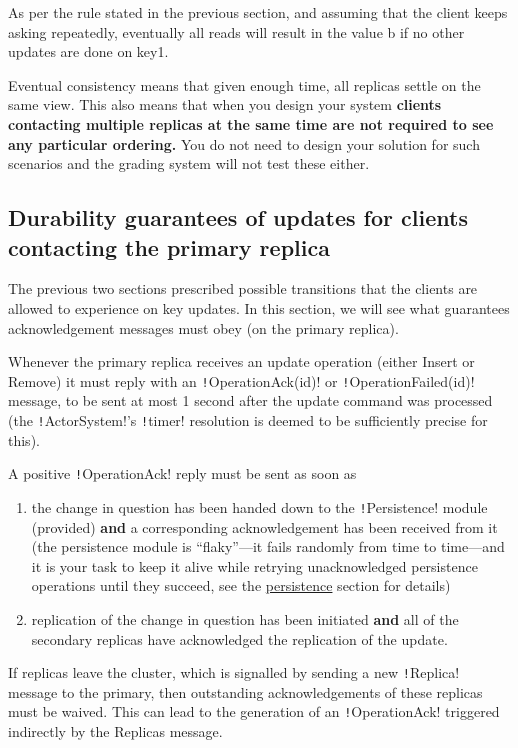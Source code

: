 \documentclass{article}
\begin{document}
As per the rule stated in the previous section, and assuming that the client keeps asking repeatedly, eventually all reads will result in the value b if no other updates are done on key1.

Eventual consistency means that given enough time, all replicas settle on the same view. This also means that when you design your system \textbf{clients contacting multiple replicas at the same time are not required to see any particular ordering.} You do not need to design your solution for such scenarios and the grading system will not test these either.

\subsection{Durability guarantees of updates for clients contacting the primary replica}

The previous two sections prescribed possible transitions that the clients are allowed to experience on key updates. In this section, we will see what guarantees acknowledgement messages must obey (on the primary replica).

Whenever the primary replica receives an update operation (either Insert or Remove) it must reply with an \texttt!OperationAck(id)! or \texttt!OperationFailed(id)! message, to be sent at most 1 second after the update command was processed (the \texttt!ActorSystem!’s \texttt!timer! resolution is deemed to be sufficiently precise for this).

A positive \texttt!OperationAck! reply must be sent as soon as

\begin{enumerate}
	\item the change in question has been handed down to the \texttt!Persistence! module (provided) \textbf{and} a corresponding acknowledgement has been received from it (the persistence module is ``flaky''—it fails randomly from time to time—and it is your task to keep it alive while retrying unacknowledged persistence operations until they succeed, see the \hyperref[ss:persistence]{persistence} section for details)
	\item replication of the change in question has been initiated \textbf{and} all of the secondary replicas have acknowledged the replication of the update.
\end{enumerate}

If replicas leave the cluster, which is signalled by sending a new \texttt!Replica! message to the primary, then outstanding acknowledgements of these replicas must be waived. This can lead to the generation of an \texttt!OperationAck! triggered indirectly by the Replicas message.
\end{document}
